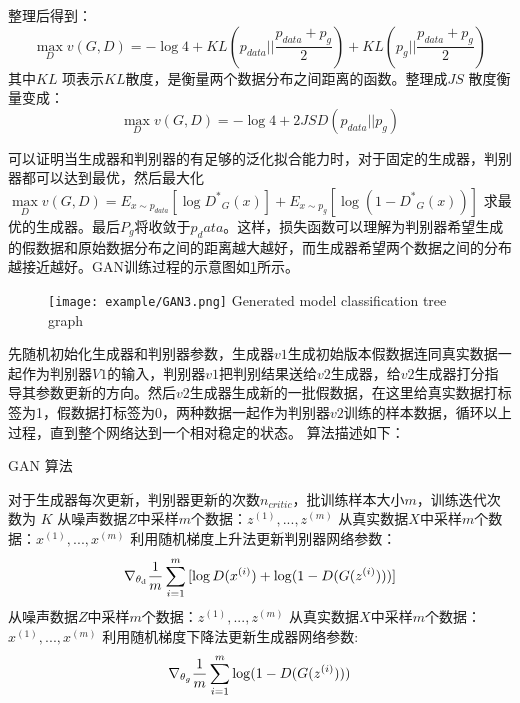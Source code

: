 整理后得到：
\begin{equation}
\label{eq:37}
\mathop {\max }\limits_D v(G,D) =  - \log 4 + KL({p_{data}}||\frac{{{p_{data}} + {p_g}}}{2}) + KL({p_g}||\frac{{{p_{data}} + {p_g}}}{2})
\end{equation}
其中$KL$ 项表示$KL$散度\cite{joyce2011kullback}，是衡量两个数据分布之间距离的函数。整理成$ JS $ 散度衡量变成：
\begin{equation}
\label{eq:38}
\mathop {\max }\limits_D v(G,D) =  - \log 4 + 2JSD({p_{data}}||{p_g})
\end{equation}

可以证明当生成器和判别器的有足够的泛化拟合能力时，对于固定的生成器，判别器都可以达到最优，然后最大化$\mathop {\max }\limits_D v(G,D) = {E_{x \sim {p_{data}}}}[\log {D^*}_G(x)] + {E_{x \sim {p_g}}}[\log (1 - {D^*}_G(x))]$ 求最优的生成器。最后$P_g$将收敛于$p_data$。这样，损失函数可以理解为判别器希望生成的假数据和原始数据分布之间的距离越大越好，而生成器希望两个数据之间的分布越接近越好。GAN训练过程的示意图如\ref{fig:train}所示。

\begin{figure}[htpb]
	\centering
	\texttt{[image: example/GAN3.png]}
	{Generated model classification tree graph}
	\label{fig:train}
\end{figure}

先随机初始化生成器和判别器参数，生成器$v1$生成初始版本假数据连同真实数据一起作为判别器$V1$的输入，判别器$v1$把判别结果送给$v2$生成器，给$v2$生成器打分指导其参数更新的方向。然后$v2$生成器生成新的一批假数据，在这里给真实数据打标签为1，假数据打标签为0，两种数据一起作为判别器$v2$训练的样本数据，循环以上过程，直到整个网络达到一个相对稳定的状态。
算法描述如下：

\begin{algorithm}[!h]
	\caption{GAN 算法}%
	\begin{algorithmic}[1]%
		\Require
		对于生成器每次更新，判别器更新的次数$n_{critic}$，批训练样本大小$m$，训练迭代次数为 $K$
		\State 从噪声数据$Z$中采样$m$个数据：${z^{(1)},...,z^{(m)}}$
		\State
		从真实数据$X$中采样$m$个数据：${x^{(1)},...,x^{(m)}}$ 
		\State 利用随机梯度上升法更新判别器网络参数：
		\begin{equation*}
			{\nabla _{{\theta _{\rm{d}}}}}\frac{{\rm{1}}}{m}\sum\limits_{i = 1}^m {[\log D({x^{(i)}}) + \log (1 - D(G({z^{(i)}})))]} 
		\end{equation*}
		\EndFor
		\State 从噪声数据$Z$中采样$m$个数据：${z^{(1)},...,z^{(m)}}$
		\State
		从真实数据$X$中采样$m$个数据：${x^{(1)},...,x^{(m)}}$ 
		\State 利用随机梯度下降法更新生成器网络参数:
		\begin{equation*}
		{\nabla _{{\theta _g}}}\frac{{\rm{1}}}{m}\sum\limits_{i = 1}^m {\log (1 - D(G({z^{(i)}})))}
		\end{equation*}
		\EndFor
	\end{algorithmic}
\end{algorithm}

